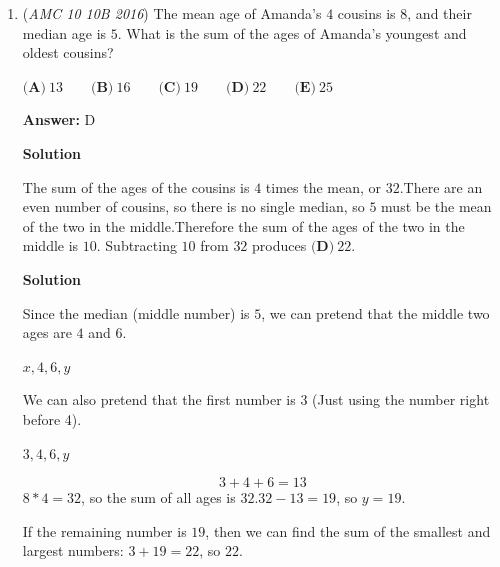 \begin{enumerate}
 



\textbf{Solution 2}

Similar to solution 1, the process took 120 days. $120 \equiv 1 \mod 7$. Since Zoey finished the first book on Monday and the second book (after three days) on Wednesday, we conclude that the modulus must correspond to the day (e.g., $1\mod 7$ corresponds to Monday, $4\mod 7$ corresponds to Thursday, $0\mod 7$ corresponds to Sunday, etc.). The solution is therefore $\boxed{\textbf{(B)}\ \text{Monday}}$.

 


 


	\item (\textit{AMC 10 10B 2016}) The mean age of Amanda's $4$ cousins is $8$, and their median age is $5$. What is the sum of the ages of Amanda's youngest and oldest cousins?


 $\textbf{(A)}\ 13\qquad\textbf{(B)}\ 16\qquad\textbf{(C)}\ 19\qquad\textbf{(D)}\ 22\qquad\textbf{(E)}\ 25$

 \textbf{Answer: }D



\textbf{Solution}

The sum of the ages of the cousins is $4$ times the mean, or $32$.There are an even number of cousins, so there is no single median, so $5$ must be the mean of the two in the middle.Therefore the sum of the ages of the two in the middle is $10$. Subtracting $10$ from $32$ produces $\textbf{(D)}\ \boxed{22}$.

 



\textbf{Solution}

Since the median (middle number) is $5$, we can pretend that the middle two ages are $4$ and $6$.

 $x, 4, 6, y$

 We can also pretend that the first number is $3$ (Just using the number right before 4).

 $3, 4, 6, y$

 \[3+4+6=13\]$8*4=32$, so the sum of all ages is $32$.$32-13=19$, so $y=19$.

 If the remaining number is $19$, then we can find the sum of the smallest and largest numbers: $3+19=22$, so $\boxed{22}$.

 


 


 



\end{enumerate}
